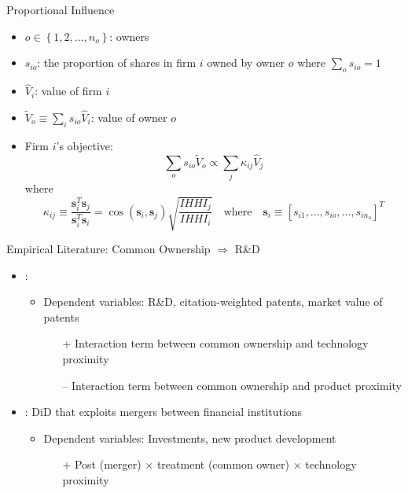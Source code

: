 \documentclass[
  10pt,
  aspectratio=169,   %
]{beamer}
\theoremstyle{plain}
\begin{document}
\begin{frame}{\cite{Rotemberg1984-jz} Proportional Influence}
  \label{rotemberg}
  \begin{itemize}
    \item $o\in\left\{ 1,2,...,n_{o}\right\} $: owners
    \item $s_{io}$: the proportion of shares in firm $i$ owned by owner $o$ where $\sum_{o}s_{io}=1$
    \item $\widehat{V}_{i}$: value of firm $i$
    \item $\widetilde{V}_{o}\equiv\sum_{i}s_{io}\widehat{V}_{i}$: value of owner $o$
    \item Firm $i$'s objective:
          \[
            \sum_{o}s_{io}\widetilde{V}_{o}\propto\sum_{j}\kappa_{ij}\widehat{V}_{j}
          \]
          where
          \[
            \kappa_{ij}\equiv\frac{\bm{s}_{i}^{T}\bm{s}_{j}}{\bm{s}_{i}^{T}\bm{s}_{i}} = \cos\left( \bm{s}_{i}, \bm{s}_{j} \right)\sqrt{\frac{IHHI_j}{IHHI_i}}
            \quad \text{where} \quad \bm{s}_{i}\equiv\left[s_{i1},...,s_{io},...,s_{in_{o}}\right]^{T}
          \]
  \end{itemize}
  \vfill %
  \hfill\hyperlink{ownership_weight}{} %
\end{frame}

\begin{frame}{Empirical Literature: Common Ownership $\Longrightarrow$ R\&D}
  \begin{itemize}
    \item \cite{Anton2024-pw}:
          \begin{itemize}
            \item Dependent variables: R\&D, citation-weighted patents, market value of patents
                  \begin{itemize}
                    \item[+] Interaction term between common ownership and technology proximity
                    \item[--] Interaction term between common ownership and product proximity
                  \end{itemize}
          \end{itemize} \medskip{}
    \item \cite{Kini2024-kd}: DiD that exploits mergers between financial institutions
          \begin{itemize}
            \item Dependent variables: Investments, new product development
                  \begin{itemize}
                    \item[+] Post (merger) $\times$ treatment (common owner) $\times$ technology proximity
                  \end{itemize}
          \end{itemize}
  \end{itemize}
\end{frame}
\end{document}
